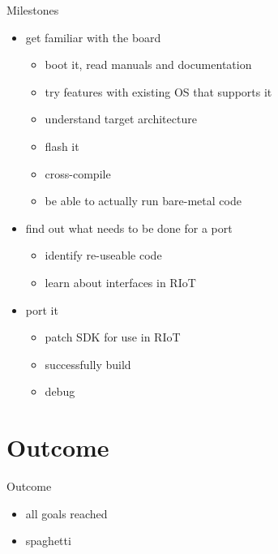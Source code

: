 \documentclass[9pt]{beamer}
\begin{document}
\begin{frame}{Milestones}
 \begin{itemize}
 \item get familiar with the board
 	\begin{itemize}
 	\item boot it, read manuals and documentation
 	\item try features with existing OS that supports it
 	\item understand target architecture
 	\item flash it
 	\item cross-compile
 	\item be able to actually run bare-metal code
 	\end{itemize}
 \item find out what needs to be done for a port
 	\begin{itemize}
 	\item identify re-useable code
 	\item learn about interfaces in RIoT
 	\end{itemize}
 \item port it
 	\begin{itemize}
 	\item patch SDK for use in RIoT
 	\item successfully build
 	\item debug
 	\end{itemize}
 \end{itemize}
\end{frame}


\section{Outcome}

\begin{frame}{Outcome}
 \begin{itemize}
  \item all goals reached
 	\item spaghetti
 \end{itemize}
\end{frame}
\end{document}

